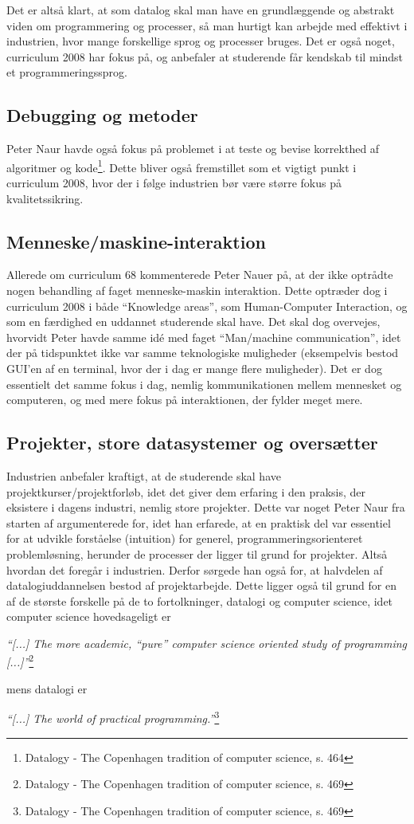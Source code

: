 \documentclass[10pt,a4paper]{article}
\newcommand{\citat}[2]{\begin{justify}\textit{``#1''}\hspace{0.1cm}\footnote{#2}\end{justify}}
\begin{document}
Det er altså klart, at som datalog skal man have en grundlæggende og abstrakt
viden om programmering og processer, så man hurtigt kan arbejde med effektivt i
industrien, hvor mange forskellige sprog og processer bruges. Det er også noget,
curriculum 2008 har fokus på, og anbefaler at studerende får kendskab til mindst
et programmeringssprog.

\subsection{Debugging og metoder}
Peter Naur havde også fokus på problemet i at teste og bevise korrekthed af
algoritmer og kode\footnote{Datalogy - The Copenhagen tradition
    of computer science, s. 464}. Dette bliver også fremstillet som et vigtigt punkt i
curriculum 2008, hvor der i følge industrien bør være større fokus på
kvalitetssikring. 

\subsection{Menneske/maskine-interaktion}
Allerede om curriculum 68 kommenterede Peter Nauer på, at der ikke optrådte
nogen behandling af faget menneske-maskin interaktion. Dette optræder dog i
curriculum 2008 i både ``Knowledge areas'', som Human-Computer Interaction, og
som en færdighed en uddannet studerende skal have. Det skal dog overvejes,
hvorvidt Peter havde samme idé med faget ``Man/machine communication'', idet der
på tidspunktet ikke var samme teknologiske muligheder (eksempelvis bestod GUI'en
af en terminal, hvor der i dag er mange flere muligheder). Det er dog essentielt
det samme fokus i dag, nemlig kommunikationen mellem mennesket og computeren, og
med mere fokus på interaktionen, der fylder meget mere.

\subsection{Projekter, store datasystemer og oversætter}
Industrien anbefaler kraftigt, at de studerende skal have
projektkurser/projektforløb, idet det giver dem erfaring i den praksis, der
eksistere i dagens industri, nemlig store projekter. Dette var noget Peter Naur
fra starten af argumenterede for, idet han erfarede, at en praktisk del var
essentiel for at udvikle forståelse (intuition) for generel,
programmeringsorienteret problemløsning, herunder de processer der ligger til
grund for projekter. Altså hvordan det foregår i industrien. Derfor sørgede han
også for, at halvdelen af datalogiuddannelsen bestod af projektarbejde. Dette
ligger også til grund for en af de største forskelle på de to fortolkninger,
datalogi og computer science, idet computer science hovedsageligt er
\citat{[...] The more academic, ``pure'' computer science oriented study of
    programming [...]}{Datalogy - The Copenhagen tradition of computer science,
    s. 469} mens datalogi er \citat{[...] The world of practical
    programming.}{Datalogy - The Copenhagen tradition of computer science, s.
    469}
\end{document}
